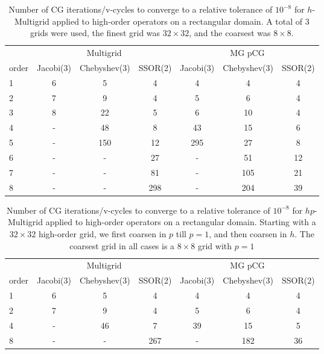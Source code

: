 

\begin{table}
  \caption{\label{tab:homg} Number of CG iterations/v-cycles to converge to a relative tolerance of $10^{-8}$ for $h$-Multigrid applied to high-order operators on a rectangular domain. A total of 3 grids were used, the finest grid was $32\times 32$, and the coarsest was $8\times 8$.}
		\centering
    \begin{tabular}{|l|c|c|c|c|c|c|} 
	    \hline
				    & \multicolumn{3}{c|}{Multigrid} & \multicolumn{3}{c|}{MG pCG}\\  \cline{2-7}
			order & \scriptsize Jacobi(3)  &\scriptsize  Chebyshev(3)  &\scriptsize SSOR(2) &\scriptsize Jacobi(3)  &\scriptsize  Chebyshev(3)  &\scriptsize SSOR(2) \\
			\hline
				1 & 6 &  5 & 4  &  4  & 4  & 4 \\ 
	    	2 & 7 &  9 & 4  &  5  & 6  & 4 \\
				3 & 8 & 22 & 5  &  6  & 10 & 4 \\
				4 & - & 48 & 8  & 43  & 15 & 6 \\
				5 & - & 150 & 12 & 295 & 27 & 8 \\
				6 & - & - & 27  & - & 51 & 12 \\
				7 & - & - & 81 & - & 105 & 21 \\
				8 & - & - & 298 & - & 204 & 39 \\
			\hline
	  \end{tabular}
\end{table}

\begin{table}
  \caption{\label{tab:hpmg} Number of CG iterations/v-cycles to converge to a relative tolerance of $10^{-8}$ for $hp$-Multigrid applied to high-order operators on a rectangular domain. Starting with a $32\times 32$ high-order grid, we first coarsen in $p$ till $p=1$, and then coarsen in $h$. The coarsest grid in all cases is a $8\times 8$ grid with $p=1$}
		\centering
		\begin{tabular}{|l|c|c|c|c|c|c|} 
	    \hline
				    & \multicolumn{3}{c|}{Multigrid} & \multicolumn{3}{c|}{MG pCG}\\  \cline{2-7}
			order & \scriptsize Jacobi(3)  &\scriptsize  Chebyshev(3)  &\scriptsize SSOR(2) &\scriptsize Jacobi(3)  &\scriptsize  Chebyshev(3)  &\scriptsize SSOR(2) \\
			\hline
				1 & 6  &  5 &  4 & 4 & 4 & 4 \\ 
	    	2 & 7 & 9  & 4 & 5 & 6 & 4 \\
				4 & - & 46 & 7 & 39 & 15 & 5 \\
				8 & - & - & 267 & - & 182 & 36 \\
			\hline
	  \end{tabular}
\end{table}


